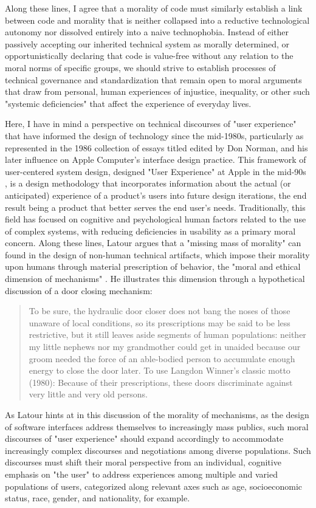 Along these lines, I agree that a morality of code must similarly establish a link between code and morality that is neither collapsed into a reductive technological autonomy nor dissolved entirely into a naive technophobia. Instead of either passively accepting our inherited technical system as morally determined, or opportunistically declaring that code is value-free without any relation to the moral norms of specific groups, we should strive to establish processes of technical governance and standardization that remain open to moral arguments that draw from personal, human experiences of injustice, inequality, or other such "systemic deficiencies" that affect the experience of everyday lives.

Here, I have in mind a perspective on technical discourses of "user experience" that have informed the design of technology since the mid-1980s, particularly as represented in the 1986 collection of essays titled  edited by Don Norman, and his later influence on Apple Computer's interface design practice. This framework of user-centered system design, designed "User Experience" at Apple in the mid-90s \autocite[see]{Norman95}, is a design methodology that incorporates information about the actual (or anticipated) experience of a product's users into future design iterations, the end result being a product that better serves the end user's needs. Traditionally, this field has focused on cognitive and psychological human factors related to the use of complex systems, with reducing deficiencies in usability as a primary moral concern. Along these lines, Latour argues that a "missing mass of morality" can found in the design of non-human technical artifacts, which impose their morality upon humans through material prescription of behavior, the "moral and ethical dimension of mechanisms" \autocite[157]{Latour92}. He illustrates this dimension through a hypothetical discussion of a door closing mechanism:
\blockcquote[158--9]{Latour92}{
  To be sure, the hydraulic door closer does not bang the noses of those unaware of local conditions, so its prescriptions may be said to be less restrictive, but it still leaves aside segments of human populations: neither my little nephews nor my grandmother could get in unaided because our groom needed the force of an able-bodied person to accumulate enough energy to close the door later. To use Langdon Winner's classic motto (1980): Because of their prescriptions, these doors discriminate against very little and very old persons.
}
As Latour hints at in this discussion of the morality of mechanisms, as the design of software interfaces address themselves to increasingly mass publics, such moral discourses of "user experience" should expand accordingly to accommodate increasingly complex discourses and negotiations among diverse populations. Such discourses must shift their moral perspective from an individual, cognitive emphasis on "the user" to address experiences among multiple and varied populations of users, categorized along relevant axes such as age, socioeconomic status, race, gender, and nationality, for example.


